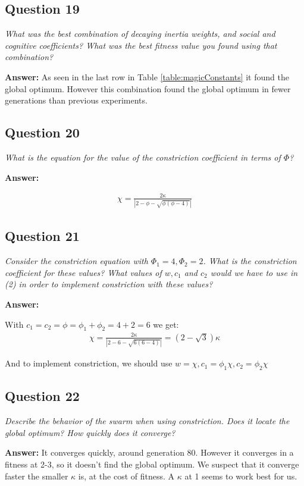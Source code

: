 \documentclass[a4paper]{article}
\begin{document}
\subsection*{Question 19}
\emph{What was the best combination of decaying inertia weights, and social and cognitive coefficients? What was the best fitness value you found using that combination?}

\textbf{Answer:} As seen in the last row in Table \ref{table:magicConstants} it found the global optimum. However this combination found the global optimum in fewer generations than previous experiments. 

\subsection*{Question 20}
\emph{What is the equation for the value of the constriction coefficient
in terms of $\Phi$?}

\textbf{Answer:}

\begin{align*}
\chi = \frac{2\kappa}{|2-\phi-\sqrt{\phi(\phi-4)}|}
\end{align*}


\subsection*{Question 21}
\emph{Consider the constriction equation with $\Phi_1 = 4, \Phi_2 = 2$. What is
the constriction coefficient for these values? What values of $w, c_1$ and
$c_2$ would we have to use in (2) in order to implement constriction with these
values?}

\textbf{Answer:}

With $c_1 = c_2 = \phi = \phi_1 + \phi_2 = 4 + 2 = 6$ we get:
\begin{align*}
\chi = \frac{2\kappa}{|2-6-\sqrt{6(6-4)}|} = (2-\sqrt{3})\kappa
\end{align*}

And to implement constriction, we should use $w = \chi, c_1 = \phi_1\chi, c_2 = \phi_2\chi$

\subsection*{Question 22}
\emph{Describe the behavior of the swarm when using constriction.
Does it locate the global optimum? How quickly does it converge?}

\textbf{Answer:} It converges quickly, around generation 80. However it converges in a fitness at 2-3, so it doesn't find the global optimum. We suspect that it converge faster the smaller $\kappa$ is, at the cost of fitness. A $\kappa$ at 1 seems to work best for us. 
\end{document}

